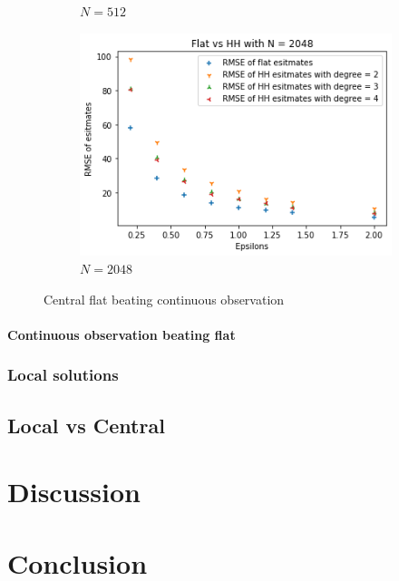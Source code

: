 \documentclass[11pt]{article}
\theoremstyle{definition}
\begin{document}
\begin{figure}[H]
\begin{subfigure}{.3\textwidth}
  \caption{$N=512$}
  \label{fig:97}
\end{subfigure}%
\begin{subfigure}{.3\textwidth}
  \centering
  \includegraphics[width=\linewidth]{figures/central_flat_hh/flat_beat_hh_N=2048.png}
  \caption{$N=2048$}
  \label{fig:98}
\end{subfigure}
\caption{Central flat beating continuous observation}
\label{fig:99}
\end{figure}


\paragraph{Continuous observation beating flat}


\subsubsection{Local solutions}


\subsection{Local vs Central}

\section{Discussion}

\section{Conclusion}
\end{document}
